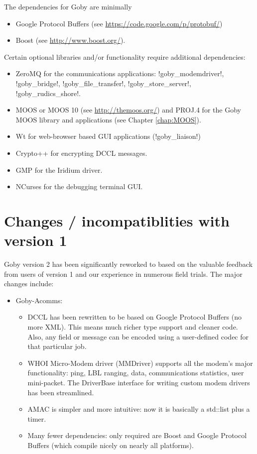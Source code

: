 The dependencies for Goby are minimally
\begin{itemize}
\item Google Protocol Buffers (see \url{https://code.google.com/p/protobuf/})
\item Boost (see \url{http://www.boost.org/}). 
\end{itemize}

Certain optional libraries and/or functionality require additional dependencies:
\begin{itemize}
\item ZeroMQ for the communications applications: !goby_modemdriver!, !goby_bridge!, !goby_file_transfer!, !goby_store_server!, !goby_rudics_shore!.
\item MOOS or MOOS 10 (see \url{http://themoos.org/}) and PROJ.4 for the Goby MOOS library and applications (see Chapter \ref{chap:MOOS}).
\item Wt for web-browser based GUI applications (!goby_liaison!) 
\item Crypto++ for encrypting DCCL messages.
\item GMP for the Iridium driver.
\item NCurses for the debugging terminal GUI.
\end{itemize}

\section{Changes / incompatiblities with version 1}

Goby version 2 has been significantly reworked to based on the valuable feedback from users of version 1 and our experience in numerous field trials.
 The major changes include:
\begin{itemize}
\item Goby-Acomms:
\begin{itemize}
\item DCCL has been rewritten to be based on Google Protocol Buffers (no more XML). This means much richer type support and cleaner code. Also,
any field or message can be encoded using a user-defined codec for that particular job.
\item WHOI Micro-Modem driver (MMDriver) supports all the modem's major functionality: ping, LBL ranging, data, communications statistics, user mini-packet. The DriverBase interface for writing custom modem drivers has been streamlined.
\item AMAC is simpler and more intuitive: now it is basically a std::list plus a timer.
\item Many fewer dependencies: only required are Boost and Google Protocol Buffers (which compile nicely on nearly all platforms).
\end{itemize}
\end{itemize}

